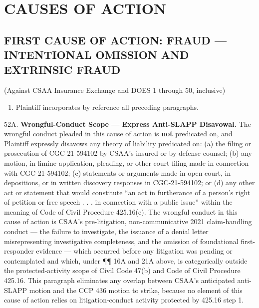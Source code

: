 \label{toc:causes-of-action}
\section{CAUSES OF ACTION}\label{causes-of-action}

\subsection{FIRST CAUSE OF ACTION: FRAUD --- INTENTIONAL OMISSION AND EXTRINSIC FRAUD}\label{first-cause-of-action-fraud-intentional-omission-and-extrinsic-fraud}

(Against CSAA Insurance Exchange and DOES 1 through 50, inclusive)

\begin{enumerate}
\def\labelenumi{\arabic{enumi}.}
\setcounter{enumi}{51}
\tightlist
\item
  Plaintiff incorporates by reference all preceding paragraphs.
\end{enumerate}

52A. \textbf{Wrongful-Conduct Scope --- Express Anti-SLAPP Disavowal.} The wrongful conduct pleaded in this cause of action is \textbf{not} predicated on, and Plaintiff expressly disavows any theory of liability predicated on: (a) the filing or prosecution of CGC-21-594102 by CSAA's insured or by defense counsel; (b) any motion, in-limine application, pleading, or other court filing made in connection with CGC-21-594102; (c) statements or arguments made in open court, in depositions, or in written discovery responses in CGC-21-594102; or (d) any other act or statement that would constitute ``an act in furtherance of a person's right of petition or free speech . . . in connection with a public issue'' within the meaning of Code of Civil Procedure \textsection{} 425.16(e). The wrongful conduct in this cause of action is CSAA's pre-litigation, non-communicative 2021 claim-handling conduct --- the failure to investigate, the issuance of a denial letter misrepresenting investigative completeness, and the omission of foundational first-responder evidence --- which occurred before any litigation was pending or contemplated and which, under ¶¶ 16A and 21A above, is categorically outside the protected-activity scope of Civil Code \textsection{} 47(b) and Code of Civil Procedure \textsection{} 425.16. This paragraph eliminates any overlap between CSAA's anticipated anti-SLAPP motion and the CCP \textsection{} 436 motion to strike, because no element of this cause of action relies on litigation-conduct activity protected by \textsection{} 425.16 step 1.

